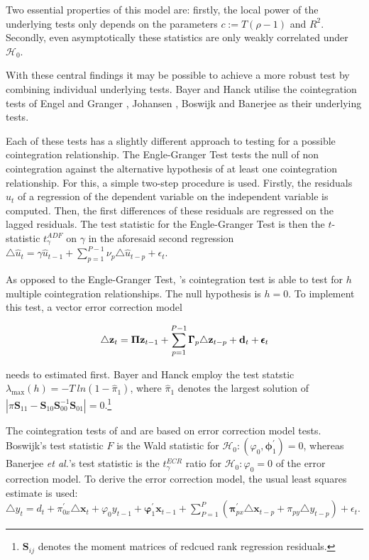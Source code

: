 \documentclass[11.5pt,a4paper]{article}
\let\rmarkdownfootnote\footnote%
\def\footnote{\protect\rmarkdownfootnote}
\begin{document}
Two essential properties of this model are: firstly, the local power of
the underlying tests only depends on the parameters \(c := T(\rho -1)\)
and \(R^2\). Secondly, even asymptotically these statistics are only
weakly correlated under \(\mathcal{H}_0\). \autocite{gregory_mixed_2004}

With these central findings it may be possible to achieve a more robust
test by combining individual underlying tests. Bayer and Hanck utilise
the cointegration tests of Engel and Granger
\autocite{Englegranger1987}, Johansen \autocite{Johansen1988}, Boswijk
\autocite{Boswijk1994} and Banerjee \autocite{Banerjee1998} as their
underlying tests.

Each of these tests has a slightly different approach to testing for a
possible cointegration relationship. The Engle-Granger Test tests the
null of non cointegration against the alternative hypothesis of at least
one cointegration relationship. For this, a simple two-step procedure is
used. Firstly, the residuals \(\hat{u}_t\) of a regression of the
dependent variable on the independent variable is computed. Then, the
first differences of these residuals are regressed on the lagged
residuals. The test statistic for the Engle-Granger Test is then the
\(t\)-statistic \(t^{ADF}_\gamma\) on \(\gamma\) in the aforesaid second
regression
\(\triangle \hat{u}_t = \gamma \hat{u}_{t-1} + \sum_{p = 1}^{P-1}\nu_p \triangle \hat{u}_{t-p} +\epsilon_t\).
\autocite{Englegranger1987}

As opposed to the Engle-Granger Test, \textcite{Johansen1988}'s
cointegration test is able to test for \(h\) multiple cointegration
relationships. The null hypothesis is \(h = 0\). To implement this test,
a vector error correction model

\begin{align}
\triangle {\bf z}_t = {\bf \Pi z}_{t-1} + \sum^{P-1}_{p=1}\pmb{\Gamma}_p \triangle{\bf z}_{t-p} + {\bf d}_t + \pmb{\epsilon}_t
\end{align}

needs to estimated first. Bayer and Hanck employ the test statstic
\(\lambda_{\max} (h) = - T \ ln(1 - \hat{\pi}_1)\), where
\(\hat{\pi}_1\) denotes the largest solution of
\(|\pi \pmb{S}_{11} - \pmb{S}_{10} \pmb{S}_{00}^{-1} \pmb{S}_{01}|= 0\).\footnote{\(\pmb{S}_{ij}\)
  denotes the moment matrices of redcued rank regression residuals.}

The cointegration tests of \textcite{Boswijk1994} and
\textcite{Banerjee1998} are based on error correction model tests.
Boswijk's test statistic \(\hat{F}\) is the Wald statistic for
\(\mathcal{H}_0: (\varphi_0, \pmb{\phi}_1^{'}) = 0\), whereas Banerjee
\emph{et al.}'s test statistic is the \(t_{\gamma}^{ECR}\) ratio for
\(\mathcal{H}_0 : \varphi_0 = 0\) of the error correction model. To
derive the error correction model, the usual least squares estimate is
used:
\(\triangle y_t = d_t + \pi_{0x}^{'} \triangle \pmb{x}_t + \varphi_0 y_{t-1} + \pmb{\varphi}_{1}^{'} \pmb{x}_{t-1} + \sum_{P = 1}^{P} \left( \pmb{\pi}_{px}^{'} \triangle \pmb{x}_{t-p} + \pi_{py} \triangle y_{t - p} \right) + \epsilon_t\).
\end{document}

